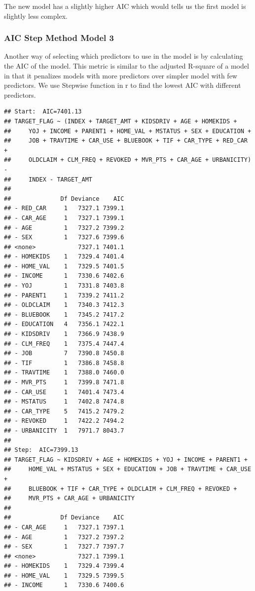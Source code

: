 \documentclass[]{article}
\begin{document}
The new model has a slightly higher AIC which would tells us the first
model is slightly less complex.

\subsubsection{AIC Step Method Model 3}\label{aic-step-method-model-3}

Another way of selecting which predictors to use in the model is by
calculating the AIC of the model. This metric is similar to the adjusted
R-square of a model in that it penalizes models with more predictors
over simpler model with few predictors. We use Stepwise function in r to
find the lowest AIC with different predictors.

\begin{verbatim}
## Start:  AIC=7401.13
## TARGET_FLAG ~ (INDEX + TARGET_AMT + KIDSDRIV + AGE + HOMEKIDS + 
##     YOJ + INCOME + PARENT1 + HOME_VAL + MSTATUS + SEX + EDUCATION + 
##     JOB + TRAVTIME + CAR_USE + BLUEBOOK + TIF + CAR_TYPE + RED_CAR + 
##     OLDCLAIM + CLM_FREQ + REVOKED + MVR_PTS + CAR_AGE + URBANICITY) - 
##     INDEX - TARGET_AMT
## 
##              Df Deviance    AIC
## - RED_CAR     1   7327.1 7399.1
## - CAR_AGE     1   7327.1 7399.1
## - AGE         1   7327.2 7399.2
## - SEX         1   7327.6 7399.6
## <none>            7327.1 7401.1
## - HOMEKIDS    1   7329.4 7401.4
## - HOME_VAL    1   7329.5 7401.5
## - INCOME      1   7330.6 7402.6
## - YOJ         1   7331.8 7403.8
## - PARENT1     1   7339.2 7411.2
## - OLDCLAIM    1   7340.3 7412.3
## - BLUEBOOK    1   7345.2 7417.2
## - EDUCATION   4   7356.1 7422.1
## - KIDSDRIV    1   7366.9 7438.9
## - CLM_FREQ    1   7375.4 7447.4
## - JOB         7   7390.8 7450.8
## - TIF         1   7386.8 7458.8
## - TRAVTIME    1   7388.0 7460.0
## - MVR_PTS     1   7399.8 7471.8
## - CAR_USE     1   7401.4 7473.4
## - MSTATUS     1   7402.8 7474.8
## - CAR_TYPE    5   7415.2 7479.2
## - REVOKED     1   7422.2 7494.2
## - URBANICITY  1   7971.7 8043.7
## 
## Step:  AIC=7399.13
## TARGET_FLAG ~ KIDSDRIV + AGE + HOMEKIDS + YOJ + INCOME + PARENT1 + 
##     HOME_VAL + MSTATUS + SEX + EDUCATION + JOB + TRAVTIME + CAR_USE + 
##     BLUEBOOK + TIF + CAR_TYPE + OLDCLAIM + CLM_FREQ + REVOKED + 
##     MVR_PTS + CAR_AGE + URBANICITY
## 
##              Df Deviance    AIC
## - CAR_AGE     1   7327.1 7397.1
## - AGE         1   7327.2 7397.2
## - SEX         1   7327.7 7397.7
## <none>            7327.1 7399.1
## - HOMEKIDS    1   7329.4 7399.4
## - HOME_VAL    1   7329.5 7399.5
## - INCOME      1   7330.6 7400.6

\end{verbatim}
\end{document}
